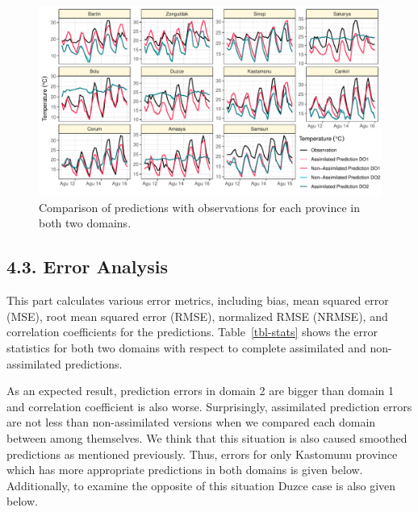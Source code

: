 \documentclass[
  letterpaper,
  DIV=11,
  numbers=noendperiod,
  abstract]{scrartcl}
\begin{document}
\begin{figure}[H]

{\centering \includegraphics{WRF_pdf_files/figure-pdf/fig-do1-2-1.pdf}

}

\caption{\label{fig-do1-2}Comparison of predictions with observations
for each province in both two domains.}

\end{figure}

\hypertarget{error-analysis}{%
\subsection{4.3. Error Analysis}\label{error-analysis}}

This part calculates various error metrics, including bias, mean squared
error (MSE), root mean squared error (RMSE), normalized RMSE (NRMSE),
and correlation coefficients for the predictions. Table~\ref{tbl-stats}
shows the error statistics for both two domains with respect to complete
assimilated and non-assimilated predictions.

As an expected result, prediction errors in domain 2 are bigger than
domain 1 and correlation coefficient is also worse. Surprisingly,
assimilated prediction errors are not less than non-assimilated versions
when we compared each domain between among themselves. We think that
this situation is also caused smoothed predictions as mentioned
previously. Thus, errors for only Kastomunu province which has more
appropriate predictions in both domains is given below. Additionally, to
examine the opposite of this situation Duzce case is also given below.
\end{document}
